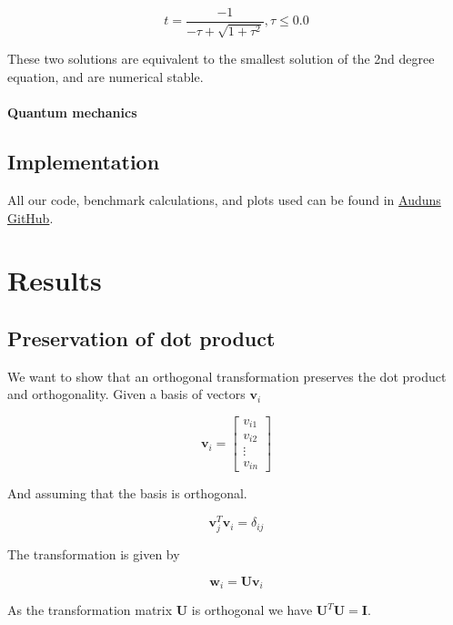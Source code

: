 \documentclass[a4paper, fontsize=11pt]{article}
\begin{document}
\begin{equation}
t = \frac{-1}{-\tau + \sqrt{1 + \tau^2}}, \tau \leq 0.0
\end{equation}

These two solutions are equivalent to the smallest solution of the 2nd degree equation, and are numerical stable.

\paragraph{Quantum mechanics}


\subsection{Implementation}

All our code, benchmark calculations, and plots used can be found in \href{https://github.com/auduntre/FYS4150/tree/master/Project%202}{Auduns GitHub}.

\section{Results}
\subsection{Preservation of dot product}
We want to show that an orthogonal transformation preserves the dot product and orthogonality. Given a basis of vectors $\textbf{v}_{i}$

\begin{equation}
\textbf{v}_{i}=
\begin{bmatrix}
v_{i1} \\
v_{i2} \\
\vdots \\
v_{in}
\end{bmatrix}
\end{equation}

And assuming that the basis is orthogonal.

\begin{equation}
\textbf{v}^{T}_{j} \textbf{v}_{i} = \delta_{ij}
\end{equation}

The transformation is given by

\begin{equation}
\textbf{w}_{i} = \textbf{U} \textbf{v}_{i}
\end{equation}

As the transformation matrix \textbf{U} is orthogonal we have $\textbf{U}^{T}\textbf{U} = \textbf{I}$.
\end{document}
